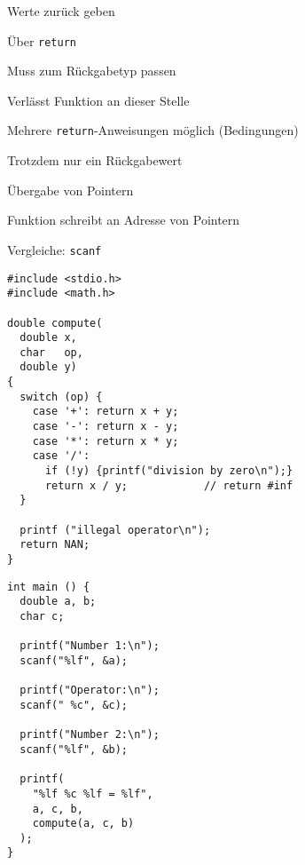 \begin{frame}[fragile]{Werte zurück geben}
%
%
\begin{itembox}
\item Über \texttt{return}
\item Muss zum Rückgabetyp passen
\item Verlässt Funktion an dieser Stelle
\item Mehrere \texttt{return}-Anweisungen möglich (Bedingungen)
\item Trotzdem nur ein Rückgabewert
\end{itembox}
%
\begin{itembox}
\item Übergabe von Pointern
\item Funktion schreibt an Adresse von Pointern
\item Vergleiche: \texttt{scanf}
\end{itembox}
%
\end{frame}


\begin{frame}[fragile]%
%
\begin{codebox}
\begin{verbatim}
#include <stdio.h>
#include <math.h>

double compute(
  double x, 
  char   op, 
  double y) 
{
  switch (op) {
    case '+': return x + y;
    case '-': return x - y;
    case '*': return x * y;
    case '/':
      if (!y) {printf("division by zero\n");}
      return x / y;            // return #inf
  }
  
  printf ("illegal operator\n");
  return NAN;
}
\end{verbatim}
\end{codebox}
%
\begin{codebox}[... Fortsetzung]
\begin{verbatim}
int main () {
  double a, b;
  char c;

  printf("Number 1:\n");
  scanf("%lf", &a);

  printf("Operator:\n");
  scanf(" %c", &c);

  printf("Number 2:\n");
  scanf("%lf", &b);

  printf(
    "%lf %c %lf = %lf",
    a, c, b,
    compute(a, c, b)
  );
}
\end{verbatim}
\end{codebox}
%
\end{frame}

